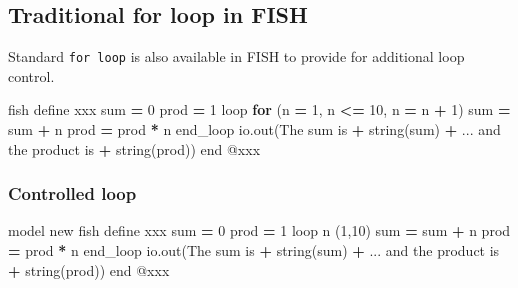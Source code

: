 \documentclass[a4paper, nobind]{templates/ociamthesis}
\newenvironment{Shaded}{\begin{snugshade}}{\end{snugshade}}
\newcommand{\AttributeTok}[1]{\textcolor[rgb]{0.77,0.63,0.00}{#1}}
\newcommand{\BuiltInTok}[1]{#1}
\newcommand{\ControlFlowTok}[1]{\textcolor[rgb]{0.13,0.29,0.53}{\textbf{#1}}}
\newcommand{\DecValTok}[1]{\textcolor[rgb]{0.00,0.00,0.81}{#1}}
\newcommand{\NormalTok}[1]{#1}
\newcommand{\OperatorTok}[1]{\textcolor[rgb]{0.81,0.36,0.00}{\textbf{#1}}}
\newcommand{\StringTok}[1]{\textcolor[rgb]{0.31,0.60,0.02}{#1}}
\renewenvironment{Shaded}
{
  \vspace{10pt}%
  \begin{snugshade}%
}{%
  \end{snugshade}%
  \vspace{8pt}%
}
\begin{document}
\hypertarget{traditional-for-loop-in-fish}{%
\subsection{Traditional for loop in FISH}\label{traditional-for-loop-in-fish}}

Standard \texttt{for\ loop} is also available in FISH to provide for additional
loop control.

\begin{Shaded}
\begin{Highlighting}[]
\NormalTok{fish define xxx}
    \BuiltInTok{sum}  \OperatorTok{=} \DecValTok{0}
\NormalTok{    prod }\OperatorTok{=} \DecValTok{1}
\NormalTok{    loop }\ControlFlowTok{for}\NormalTok{ (n }\OperatorTok{=} \DecValTok{1}\NormalTok{, n }\OperatorTok{\textless{}=} \DecValTok{10}\NormalTok{, n }\OperatorTok{=}\NormalTok{ n }\OperatorTok{+} \DecValTok{1}\NormalTok{)}
        \BuiltInTok{sum}  \OperatorTok{=} \BuiltInTok{sum}  \OperatorTok{+}\NormalTok{ n}
\NormalTok{        prod }\OperatorTok{=}\NormalTok{ prod }\OperatorTok{*}\NormalTok{ n}
\NormalTok{    end\_loop}
\NormalTok{    io.out(}\StringTok{\textquotesingle{}The sum is \textquotesingle{}} \OperatorTok{+}\NormalTok{ string(}\BuiltInTok{sum}\NormalTok{) }\OperatorTok{+}\NormalTok{ ... }
           \StringTok{\textquotesingle{} and the product is \textquotesingle{}} \OperatorTok{+}\NormalTok{ string(prod))}
\NormalTok{end}
\AttributeTok{@xxx}
\end{Highlighting}
\end{Shaded}

\hypertarget{controlled-loop}{%
\subsubsection{Controlled loop}\label{controlled-loop}}

\begin{Shaded}
\begin{Highlighting}[]
\NormalTok{model new}
\NormalTok{fish define xxx}
    \BuiltInTok{sum}  \OperatorTok{=} \DecValTok{0}
\NormalTok{    prod }\OperatorTok{=} \DecValTok{1}
\NormalTok{    loop n (}\DecValTok{1}\NormalTok{,}\DecValTok{10}\NormalTok{)}
        \BuiltInTok{sum}  \OperatorTok{=} \BuiltInTok{sum}  \OperatorTok{+}\NormalTok{ n}
\NormalTok{        prod }\OperatorTok{=}\NormalTok{ prod }\OperatorTok{*}\NormalTok{ n}
\NormalTok{    end\_loop}
\NormalTok{    io.out(}\StringTok{\textquotesingle{}The sum is \textquotesingle{}} \OperatorTok{+}\NormalTok{ string(}\BuiltInTok{sum}\NormalTok{) }\OperatorTok{+}\NormalTok{  ...}
           \StringTok{\textquotesingle{} and the product is \textquotesingle{}} \OperatorTok{+}\NormalTok{ string(prod))}
\NormalTok{end}
\AttributeTok{@xxx}
\end{Highlighting}
\end{Shaded}
\end{document}
